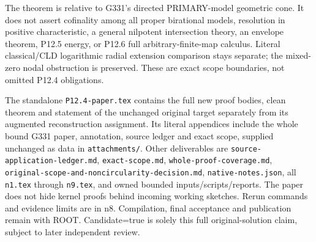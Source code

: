 The theorem is relative to G331's directed PRIMARY-model geometric cone. It does not assert cofinality among all proper birational models, resolution in positive characteristic, a general nilpotent intersection theory, an envelope theorem, P12.5 energy, or P12.6 full arbitrary-finite-map calculus. Literal classical/CLD logarithmic radial extension comparison stays separate; the mixed-zero nodal obstruction is preserved. These are exact scope boundaries, not omitted P12.4 obligations.

The standalone \texttt{P12.4-paper.tex} contains the full new proof bodies, clean theorem and statement of the unchanged original target separately from its augmented reconstruction assignment. Its literal appendices include the whole bound G331 paper, annotation, source ledger and exact scope, supplied unchanged as data in \texttt{attachments/}. Other deliverables are \texttt{source-application-ledger.md}, \texttt{exact-scope.md}, \texttt{whole-proof-coverage.md}, \texttt{original-scope-and-noncircularity-decision.md}, \texttt{native-notes.json}, all \texttt{n1.tex} through \texttt{n9.tex}, and owned bounded inputs/scripts/reports. The paper does not hide kernel proofs behind incoming working sketches. Rerun commands and evidence limits are in n8. Compilation, final acceptance and publication remain with ROOT. Candidate=true is solely this full original-solution claim, subject to later independent review.
